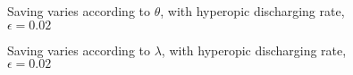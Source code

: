 \documentclass{article}
\begin{document}
%
%
%

\begin{figure}
\begin{center}

\caption{Saving varies according to $\theta$, with hyperopic discharging rate,  $\epsilon=0.02$}
\end{center}
\end{figure}

%

\begin{figure}
\begin{center}

\caption{Saving varies according to $\lambda$, with hyperopic discharging rate,  $\epsilon=0.02$}
\end{center}
\end{figure}

%


%
%
%
\end{document}
